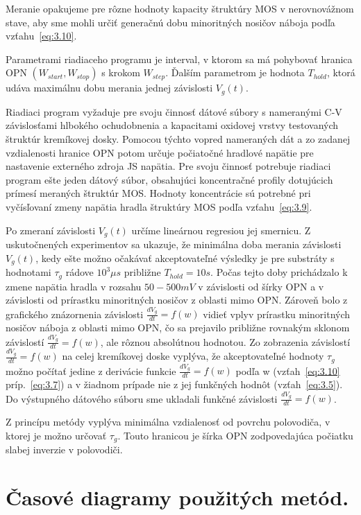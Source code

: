 Meranie opakujeme pre rôzne hodnoty kapacity štruktúry MOS v
nerovnovážnom stave, aby sme mohli určiť generačnú dobu minoritných
nosičov náboja podľa vzťahu~\ref{eq:3.10}.

Parametrami riadiaceho programu je interval, v ktorom sa má pohybovať
hranica OPN $(W_{start}, W_{stop})$ s krokom $W_{step}$. Ďalším
parametrom je hodnota $T_{hold}$, ktorá udáva maximálnu dobu merania
jednej závislosti $V_{g}(t)$.

Riadiaci program vyžaduje pre svoju činnosť dátové súbory s nameranými
C-V závislosťami hlbokého ochudobnenia a kapacitami oxidovej vrstvy
testovaných štruktúr kremíkovej dosky. Pomocou týchto vopred
nameraných dát a zo zadanej vzdialenosti hranice OPN potom určuje
počiatočné hradlové napätie pre nastavenie externého zdroja JS
napätia.  Pre svoju činnosť potrebuje riadiaci program ešte jeden
dátový súbor, obsahujúci koncentračné profily dotujúcich prímesí
meraných štruktúr MOS\@. Hodnoty koncentrácie sú potrebné pri
vyčísľovaní zmeny napätia hradla štruktúry MOS podľa
vzťahu~\ref{eq:3.9}.

Po zmeraní závislosti $V_{g}(t)$ určíme lineárnou regresiou jej
smernicu. Z uskutočnených experimentov sa ukazuje, že minimálna doba
merania závislosti $V_{g}(t)$, kedy ešte možno očakávať akceptovateľné
výsledky je pre substráty s hodnotami $\tau_g$ rádove $10^{3}\mu{s}$
približne $T_{hold}=10s$. Počas tejto doby prichádzalo k zmene napätia
hradla v rozsahu $50-500 mV$ v závislosti od šírky OPN a v závislosti
od prírastku minoritných nosičov z oblasti mimo OPN\@. Zároveň bolo z
grafického znázornenia závislosti $\frac{dV_g}{dt}=f(w)$ vidieť vplyv
prírastku minoritných nosičov náboja z oblasti mimo OPN, čo sa
prejavilo približne rovnakým sklonom závislostí
$\frac{dV_g}{dt}=f(w)$, ale rôznou absolútnou hodnotou. Zo zobrazenia
závislostí $\frac{dV_g}{dt}=f(w)$ na celej kremíkovej doske vyplýva,
že akceptovateľné hodnoty $\tau_{g}$ možno počítať jedine z derivácie
funkcie $\frac{dV_g}{dt}=f(w)$ podľa w (vzťah~\ref{eq:3.10}
príp.~\ref{eq:3.7}) a v žiadnom prípade nie z jej funkčných hodnôt
(vzťah~\ref{eq:3.5}). Do výstupného dátového súboru sme ukladali
funkčné závislosti $\frac{dV_g}{dt}=f(w)$.

Z princípu metódy vyplýva minimálna vzdialenosť od povrchu polovodiča,
v ktorej je možno určovať $\tau_{g}$. Touto hranicou je šírka OPN
zodpovedajúca počiatku slabej inverzie v polovodiči.

\section{Časové diagramy použitých metód.}\label{sec:5.4}

